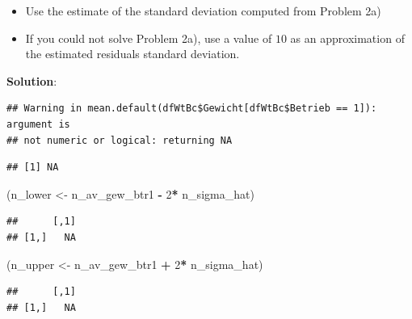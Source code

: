\documentclass[]{article}
\newenvironment{Shaded}{\begin{snugshade}}{\end{snugshade}}
\newcommand{\KeywordTok}[1]{\textcolor[rgb]{0.13,0.29,0.53}{\textbf{#1}}}
\newcommand{\DecValTok}[1]{\textcolor[rgb]{0.00,0.00,0.81}{#1}}
\newcommand{\StringTok}[1]{\textcolor[rgb]{0.31,0.60,0.02}{#1}}
\newcommand{\OperatorTok}[1]{\textcolor[rgb]{0.81,0.36,0.00}{\textbf{#1}}}
\newcommand{\NormalTok}[1]{#1}
\providecommand{\tightlist}{%
  \setlength{\itemsep}{0pt}\setlength{\parskip}{0pt}}
\newcommand{\sol}
{\vspace{2ex}\textbf{Solution}:}
\begin{document}
\begin{itemize}
\tightlist
\item
  Use the estimate of the standard deviation computed from Problem 2a)
\item
  If you could not solve Problem 2a), use a value of \(10\) as an
  approximation of the estimated residuals standard deviation.
\end{itemize}

\sol

\begin{Shaded}
\end{Shaded}

\begin{verbatim}
## Warning in mean.default(dfWtBc$Gewicht[dfWtBc$Betrieb == 1]): argument is
## not numeric or logical: returning NA
\end{verbatim}

\begin{verbatim}
## [1] NA
\end{verbatim}

\begin{Shaded}
\begin{Highlighting}[]
\NormalTok{(n_lower <-}\StringTok{  }\NormalTok{n_av_gew_btr1 }\OperatorTok{-}\StringTok{ }\DecValTok{2}\OperatorTok{*}\StringTok{ }\NormalTok{n_sigma_hat)}
\end{Highlighting}
\end{Shaded}

\begin{verbatim}
##      [,1]
## [1,]   NA
\end{verbatim}

\begin{Shaded}
\begin{Highlighting}[]
\NormalTok{(n_upper <-}\StringTok{ }\NormalTok{n_av_gew_btr1 }\OperatorTok{+}\StringTok{ }\DecValTok{2}\OperatorTok{*}\StringTok{ }\NormalTok{n_sigma_hat)}
\end{Highlighting}
\end{Shaded}

\begin{verbatim}
##      [,1]
## [1,]   NA
\end{verbatim}
\end{document}
